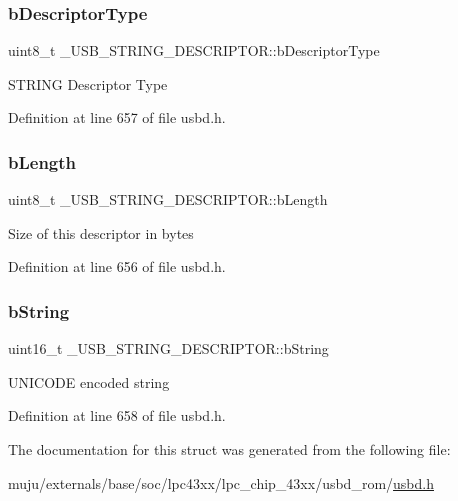 \subsubsection{\texorpdfstring{b\+Descriptor\+Type}{bDescriptorType}}
{\footnotesize\ttfamily uint8\+\_\+t \+\_\+\+U\+S\+B\+\_\+\+S\+T\+R\+I\+N\+G\+\_\+\+D\+E\+S\+C\+R\+I\+P\+T\+O\+R\+::b\+Descriptor\+Type}

S\+T\+R\+I\+NG Descriptor Type 

Definition at line 657 of file usbd.\+h.

\mbox{\label{struct___u_s_b___s_t_r_i_n_g___d_e_s_c_r_i_p_t_o_r_a27d5cd3019611e53d3588192d4c72b05}} 
\subsubsection{\texorpdfstring{b\+Length}{bLength}}
{\footnotesize\ttfamily uint8\+\_\+t \+\_\+\+U\+S\+B\+\_\+\+S\+T\+R\+I\+N\+G\+\_\+\+D\+E\+S\+C\+R\+I\+P\+T\+O\+R\+::b\+Length}

Size of this descriptor in bytes 

Definition at line 656 of file usbd.\+h.

\mbox{\label{struct___u_s_b___s_t_r_i_n_g___d_e_s_c_r_i_p_t_o_r_abbe1c4825365ecb9af165153435a6ef4}} 
\subsubsection{\texorpdfstring{b\+String}{bString}}
{\footnotesize\ttfamily uint16\+\_\+t \+\_\+\+U\+S\+B\+\_\+\+S\+T\+R\+I\+N\+G\+\_\+\+D\+E\+S\+C\+R\+I\+P\+T\+O\+R\+::b\+String}

U\+N\+I\+C\+O\+DE encoded string 

Definition at line 658 of file usbd.\+h.



The documentation for this struct was generated from the following file\+:\begin{DoxyCompactItemize}
\item 
muju/externals/base/soc/lpc43xx/lpc\+\_\+chip\+\_\+43xx/usbd\+\_\+rom/\hyperlink{usbd_8h}{usbd.\+h}\end{DoxyCompactItemize}
